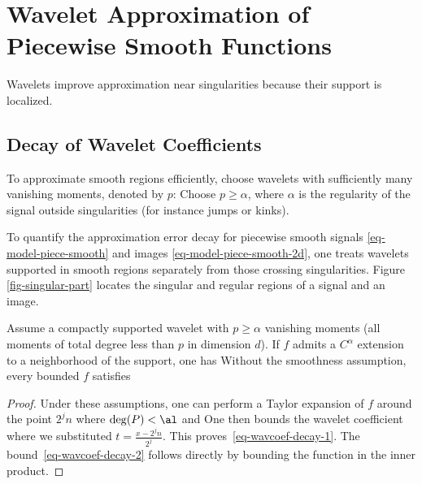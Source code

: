 \section{Wavelet Approximation of Piecewise Smooth Functions}

Wavelets improve approximation near singularities because their support is localized.

                                        
\subsection{Decay of Wavelet Coefficients}
\label{subsect-wavdecay}

To approximate smooth regions efficiently, choose wavelets with sufficiently many vanishing moments, denoted by $p$:
Choose $p\geq\alpha$, where $\alpha$ is the regularity of the signal outside singularities (for instance jumps or kinks).


To quantify the approximation error decay for piecewise smooth signals \eqref{eq-model-piece-smooth} and images \eqref{eq-model-piece-smooth-2d}, one treats wavelets supported in smooth regions separately from those crossing singularities. Figure \ref{fig-singular-part} locates the singular and regular regions of a signal and an image.

\begin{prop}
Assume a compactly supported wavelet with $p\geq\alpha$ vanishing moments (all moments of total degree less than $p$ in dimension $d$). If $f$ admits a $C^\alpha$ extension to a neighborhood of the support, one has
Without the smoothness assumption, every bounded $f$ satisfies
\end{prop}

\begin{proof}
Under these assumptions, one can perform a Taylor expansion of $f$ around the point $2^j n$
where $\deg(P)<\al$ and 
One then bounds the wavelet coefficient
where we substituted $t = \frac{x-2^j n}{2^j}$. This proves~\eqref{eq-wavcoef-decay-1}. The bound~\eqref{eq-wavcoef-decay-2} follows directly by bounding the function in the inner product.
\end{proof}

